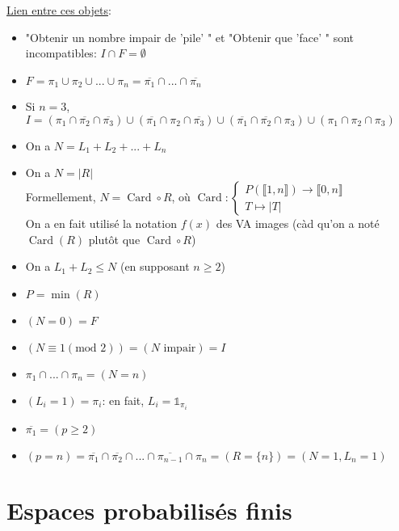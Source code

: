 \documentclass[10pt,a4paper]{article}
\theoremstyle{definition}
\DeclareMathOperator{\card}{Card}
\begin{document}
\noindent \uline{Lien entre ces objets}:
\begin{itemize}
\item "Obtenir un nombre impair de 'pile' " et "Obtenir que 'face' " sont incompatibles: $I \cap F = \emptyset$
\item $F = \pi_1 \cup \pi_2 \cup ... \cup \pi_n = \overline{\pi_1} \cap ... \cap \overline{\pi_n}$
\item Si $n = 3$, $I = (\pi_1 \cap \overline{\pi_2} \cap \overline{\pi_3}) \cup (\overline{\pi_1} \cap \pi_2 \cap \overline{\pi_3}) \cup (\overline{\pi_1} \cap \overline{\pi_2} \cap \pi_3) \cup (\pi_1 \cap \pi_2 \cap \pi_3)$
\item On a $N = L_1 + L_2 + ... + L_n$
\item On a $N = \left| R \right|$ \\
Formellement, $N = \card \circ R$, où $\card: \begin{cases}
P(\llbracket 1, n \rrbracket) \to \llbracket 0, n \rrbracket \\
T \mapsto \left| T \right|
\end{cases}$ \\
On a en fait utilisé la notation $f(x)$ des VA images (càd qu'on a noté $\card(R)$ plutôt que $\card \circ R$)
\item On a $L_1 + L_2 \leq N$ (en supposant $n \geq 2$)
\item $P = \min(R)$
\item $(N = 0) = F$
\item $(N \equiv 1 (\text{mod }2)) = (N \text{ impair}) = I$
\item $\pi_1 \cap ... \cap \pi_n = (N = n)$
\item $(L_i = 1) = \pi_i$: en fait, $L_i = \mathds{1}_{\pi_i}$
\item $\overline{\pi_1} = (p \geq 2)$
\item $(p = n) = \overline{\pi_1} \cap \overline{\pi_2} \cap ... \cap \overline{\pi_{n - 1}} \cap \pi_n = (R = \{ n \}) = (N = 1, L_n = 1)$
\end{itemize}

\section{Espaces probabilisés finis}
\end{document}

